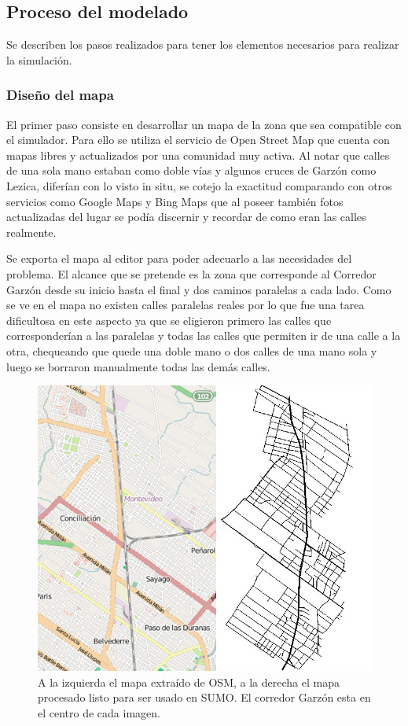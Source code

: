 \subsection{Proceso del modelado}

Se describen los pasos realizados para tener los elementos necesarios para realizar la simulación.

\subsubsection{Diseño del mapa}

El primer paso consiste en desarrollar un mapa de la zona que sea compatible con el simulador. Para ello se utiliza el servicio de Open Street Map \citep{OSM} que cuenta con mapas libres y actualizados por una comunidad muy activa. Al notar que calles de una sola mano estaban como doble vías y algunos cruces de Garzón como Lezica, diferían con lo visto in situ, se cotejo la exactitud comparando con otros servicios como Google Maps y Bing Maps que al poseer también fotos actualizadas del lugar se podía discernir y recordar de como eran las calles realmente.

Se exporta el mapa al editor \citet{JOSM} para poder adecuarlo a las necesidades del problema. El alcance que se pretende es la zona que corresponde al Corredor Garzón desde su inicio hasta el final y dos caminos paralelas a cada lado. Como se ve en el mapa no existen calles paralelas reales por lo que fue una tarea dificultosa en este aspecto ya que se eligieron primero las calles que corresponderían a las paralelas y todas las calles que permiten ir de una calle a la otra, chequeando que quede una doble mano o dos calles de una mano sola y luego se borraron manualmente todas las demás calles.

\begin{figure}[H]
	\centering
	\includegraphics[width=0.9\linewidth]{Figures/mapa_osm_sumo}
	\caption{A la izquierda el mapa extraído de OSM, a la derecha el mapa procesado listo para ser usado en SUMO. El corredor Garzón esta en el centro de cada imagen.}
	\label{fig:mapa_osm_sumo}
\end{figure}

